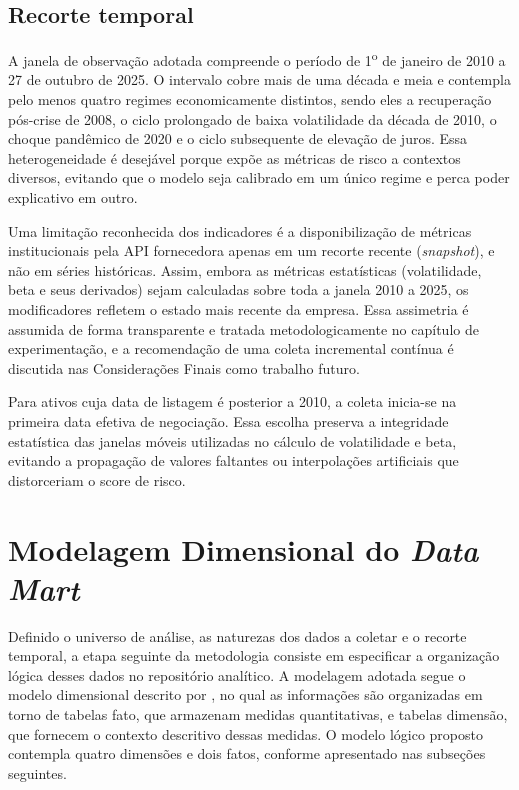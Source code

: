 \subsection{Recorte temporal}
\label{sec:recorte-temporal}

A janela de observação adotada compreende o período de 1\textsuperscript{o} de janeiro de 2010 a 27 de outubro de 2025. O intervalo cobre mais de uma década e meia e contempla pelo menos quatro regimes economicamente distintos, sendo eles a recuperação pós-crise de 2008, o ciclo prolongado de baixa volatilidade da década de 2010, o choque pandêmico de 2020 e o ciclo subsequente de elevação de juros. Essa heterogeneidade é desejável porque expõe as métricas de risco a contextos diversos, evitando que o modelo seja calibrado em um único regime e perca poder explicativo em outro.

Uma limitação reconhecida dos indicadores é a disponibilização de métricas institucionais pela API fornecedora apenas em um recorte recente (\textit{snapshot}), e não em séries históricas. Assim, embora as métricas estatísticas (volatilidade, beta e seus derivados) sejam calculadas sobre toda a janela 2010 a 2025, os modificadores refletem o estado mais recente da empresa. Essa assimetria é assumida de forma transparente e tratada metodologicamente no capítulo de experimentação, e a recomendação de uma coleta incremental contínua é discutida nas Considerações Finais como trabalho futuro.

Para ativos cuja data de listagem é posterior a 2010, a coleta inicia-se na primeira data efetiva de negociação. Essa escolha preserva a integridade estatística das janelas móveis utilizadas no cálculo de volatilidade e beta, evitando a propagação de valores faltantes ou interpolações artificiais que distorceriam o score de risco.

\section{Modelagem Dimensional do \textit{Data Mart}}
\label{sec:modelagem-dimensional}

Definido o universo de análise, as naturezas dos dados a coletar e o recorte temporal, a etapa seguinte da metodologia consiste em especificar a organização lógica desses dados no repositório analítico. A modelagem adotada segue o modelo dimensional descrito por , no qual as informações são organizadas em torno de tabelas fato, que armazenam medidas quantitativas, e tabelas dimensão, que fornecem o contexto descritivo dessas medidas. O modelo lógico proposto contempla quatro dimensões e dois fatos, conforme apresentado nas subseções seguintes.

